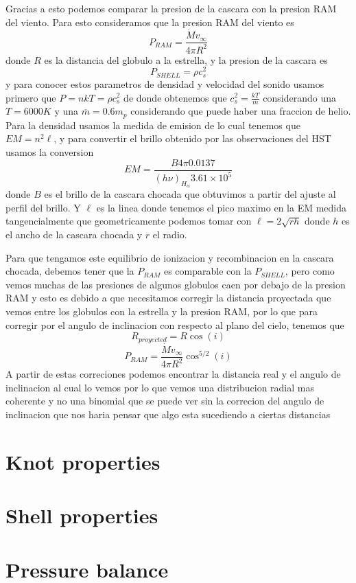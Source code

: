 \documentclass[twocolumn, times]{aastex631}
\begin{document}
Gracias a esto podemos comparar la presion de la cascara con la presion RAM del viento. Para esto consideramos que la presion RAM del viento es 
\[P_{RAM}=\frac{\dot{M}v_\infty}{4\pi R^2}\]
donde $R$ es la distancia del globulo a la estrella, y la presion de la cascara es 
\[P_{SHELL}=\rho c_s^2\] 
y para conocer estos parametros de densidad y velocidad del sonido usamos primero que $P=nkT=\rho c_s^2$ de donde obtenemos que $c_s^2=\frac{k T}{\overline{m}}$ considerando una $T=6000 K$ y una $\overline{m}=0.6m_p$ considerando que puede haber una fraccion de helio.
Para la densidad usamos la medida de emision de lo cual tenemos que $EM=n^2\ell$, y para convertir el brillo obtenido por las observaciones del HST usamos la conversion 
\[EM=\frac{B 4\pi 0.0137}{(h\nu)_{H_\alpha}3.61\times10^5}\]
donde $B$ es el brillo de la cascara chocada que obtuvimos a partir del ajuste al perfil del brillo. Y $\ell$ es la linea donde tenemos el pico maximo en la EM medida tangencialmente que geometricamente podemos tomar con $\ell=2\sqrt{r h}$ donde $h$ es el ancho de la cascara chocada y $r$ el radio.

Para que tengamos este equilibrio de ionizacion y recombinacion en la cascara chocada, debemos tener que la $P_{RAM}$ es comparable con la $P_{SHELL}$, pero como vemos muchas de las presiones de algunos globulos caen por debajo de la presion RAM y esto es debido a que necesitamos corregir la distancia proyectada que vemos entre los globulos con la estrella y la presion RAM, por lo que para corregir por el angulo de inclinacion con respecto al plano del cielo, tenemos que
\[R_{proyected}=R \cos(i)\]
\[P_{RAM}=\frac{\dot{M}v_\infty}{4\pi R^2}\cos^{5/2}(i)\]
A partir de estas correciones podemos encontrar la distancia real y el angulo de inclinacion al cual lo vemos por lo que vemos una distribucion radial mas coherente y no una binomial que se puede ver sin la correcion del angulo de inclinacion que nos haria pensar que algo esta sucediendo a ciertas distancias

\section{Knot properties}
\label{sec:knot-properties}


\section{Shell properties}
\label{sec:shell-properties}


\section{Pressure balance}
\label{sec:pressure-balance}
\end{document}
